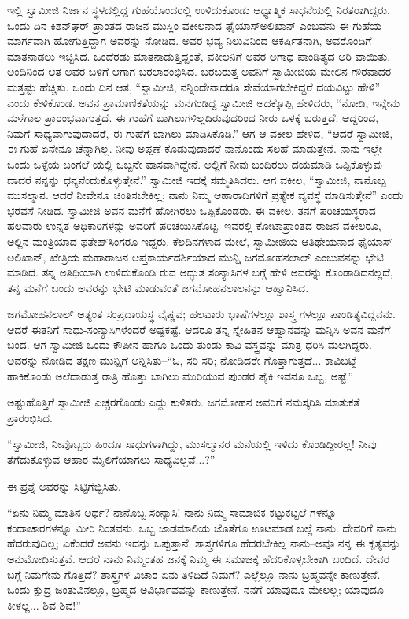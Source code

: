 ಇಲ್ಲಿ ಸ್ವಾಮೀಜಿ ನಿರ್ಜನ ಸ್ಥಳದಲ್ಲಿದ್ದ ಗುಹೆಯೊಂದರಲ್ಲಿ ಉಳಿದುಕೊಂಡು ಆಧ್ಯಾತ್ಮಿಕ ಸಾಧನೆಯಲ್ಲಿ ನಿರತರಾಗಿದ್ದರು. ಒಂದು ದಿನ ಕಿಶನ್​ಘರ್ ಪ್ರಾಂತದ ರಾಜನ ಮುಸ್ಲಿಂ ವಕೀಲನಾದ ಫೈಯಾಸ್​ಅಲಿಖಾನ್ ಎಂಬವನು ಈ ಗುಹೆಯ ಮಾರ್ಗವಾಗಿ ಹೋಗುತ್ತಿದ್ದಾಗ ಅವರನ್ನು ನೋಡಿದ. ಅವರ ಭವ್ಯ ನಿಲುವಿನಿಂದ ಆಕರ್ಷಿತನಾಗಿ, ಅವರೊಂದಿಗೆ ಮಾತನಾಡಲು ಇಚ್ಛಿಸಿದ. ಒಂದೆರಡು ಮಾತನಾಡುತ್ತಿದ್ದಂತೆ, ವಕೀಲನಿಗೆ ಅವರ ಅಗಾಧ ಪಾಂಡಿತ್ಯದ ಅರಿ ವಾಯಿತು. ಅಂದಿನಿಂದ ಆತ ಅವರ ಬಳಿಗೆ ಆಗಾಗ ಬರಲಾರಂಭಿಸಿದ. ಬರಬರುತ್ತ ಅವನಿಗೆ ಸ್ವಾಮೀಜಿಯ ಮೇಲಿನ ಗೌರವಾದರ ಮತ್ತಷ್ಟು ಹೆಚ್ಚಿತು. ಒಂದು ದಿನ ಆತ, “ಸ್ವಾಮೀಜಿ, ನನ್ನಿಂದೇನಾದರೂ ಸೇವೆಯಾಗಬೇಕಿದ್ದರೆ ದಯವಿಟ್ಟು ಹೇಳಿ” ಎಂದು ಕೇಳಿಕೊಂಡ. ಅವನ ಪ್ರಾಮಾಣಿಕತೆಯನ್ನು ಮನಗಂಡಿದ್ದ ಸ್ವಾಮೀಜಿ ಅದಕ್ಕೊಪ್ಪಿ ಹೇಳಿದರು, “ನೋಡಿ, ಇನ್ನೇನು ಮಳೆಗಾಲ ಪ್ರಾರಂಭವಾಗುತ್ತದೆ. ಈ ಗುಹೆಗೆ ಬಾಗಿಲುಗಳಿಲ್ಲದಿರುವುದರಿಂದ ನೀರು ಒಳಕ್ಕೆ ಬರುತ್ತದೆ. ಆದ್ದರಿಂದ, ನಿಮಗೆ ಸಾಧ್ಯವಾಗುವುದಾದರೆ, ಈ ಗುಹೆಗೆ ಬಾಗಿಲು ಮಾಡಿಸಿಕೊಡಿ.” ಆಗ ಆ ವಕೀಲ ಹೇಳಿದ, “ಆದರೆ ಸ್ವಾಮೀಜಿ, ಈ ಗುಹೆ ಏನೇನೂ ಚೆನ್ನಾಗಿಲ್ಲ. ನೀವು ಅಪ್ಪಣೆ ಕೊಡುವುದಾದರೆ ನಾನೊಂದು ಸಲಹೆ ಮಾಡುತ್ತೇನೆ. ನಾನು ಇಲ್ಲೇ ಒಂದು ಒಳ್ಳೆಯ ಬಂಗಲೆ ಯಲ್ಲಿ ಒಬ್ಬನೇ ವಾಸವಾಗಿದ್ದೇನೆ. ಅಲ್ಲಿಗೆ ನೀವು ಬಂದಿರಲು ದಯಮಾಡಿ ಒಪ್ಪಿಕೊಳ್ಳುವು ದಾದರೆ ನನ್ನನ್ನು ಧನ್ಯನೆಂದುಕೊಳ್ಳುತ್ತೇನೆ.” ಸ್ವಾಮೀಜಿ ಇದಕ್ಕೆ ಸಮ್ಮತಿಸಿದರು. ಆಗ ವಕೀಲ, “ಸ್ವಾಮೀಜಿ, ನಾನೊಬ್ಬ ಮುಸಲ್ಮಾನ. ಆದರೆ ನೀವೇನೂ ಚಿಂತಿಸಬೇಕಿಲ್ಲ; ನಾನು ನಿಮ್ಮ ಆಹಾರಾದಿಗಳಿಗೆ ಪ್ರತ್ಯೇಕ ವ್ಯವಸ್ಥೆ ಮಾಡಿಸುತ್ತೇನೆ” ಎಂದು ಭರವಸೆ ನೀಡಿದ. ಸ್ವಾಮೀಜಿ ಅವನ ಮನೆಗೆ ಹೋಗಿರಲು ಒಪ್ಪಿಕೊಂಡರು. ಈ ವಕೀಲ, ತನಗೆ ಪರಿಚಯಸ್ಥರಾದ ಹಲವಾರು ಉನ್ನತ ಅಧಿಕಾರಿಗಳನ್ನು ಅವರಿಗೆ ಪರಿಚಯಿಸಿಕೊಟ್ಟ. ಇವರಲ್ಲಿ ಕೋಟಾಪ್ರಾಂತದ ರಾಜನ ವಕೀಲರೂ, ಅಲ್ಲಿನ ಮಂತ್ರಿಯಾದ ಫತೇಹ್​ಸಿಂಗರೂ ಇದ್ದರು. ಕೆಲದಿನಗಳಾದ ಮೇಲೆ, ಸ್ವಾಮೀಜಿಯ ಆತಿಥೇಯನಾದ ಫೈಯಾಸ್ ಅಲಿಖಾನ್, ಖೇತ್ರಿಯ ಮಹಾರಾಜನ ಆಪ್ತಕಾರ್ಯದರ್ಶಿಯಾದ ಮುನ್ಷಿ ಜಗಮೋಹನಲಾಲ್ ಎಂಬುವನನ್ನು ಭೇಟಿ ಮಾಡಿದ. ತನ್ನ ಅತಿಥಿಯಾಗಿ ಉಳಿದುಕೊಂಡಿ ರುವ ಅದ್ಭುತ ಸಂನ್ಯಾಸಿಗಳ ಬಗ್ಗೆ ಹೇಳಿ ಅವರನ್ನು ಕೊಂಡಾಡಿದನಲ್ಲದೆ, ತನ್ನ ಮನೆಗೆ ಬಂದು ಅವರನ್ನು ಭೇಟಿ ಮಾಡುವಂತೆ ಜಗಮೋಹನಲಾಲನನ್ನು ಆಹ್ವಾನಿಸಿದ.

ಜಗಮೋಹನಲಾಲ್ ಅತ್ಯಂತ ಸಂಪ್ರದಾಯಸ್ಥ ವೈಷ್ಣವ; ಹಲವಾರು ಭಾಷೆಗಳಲ್ಲೂ ಶಾಸ್ತ್ರ ಗಳಲ್ಲೂ ಪಾಂಡಿತ್ಯವಿದ್ದವನು. ಆದರೆ ಈತನಿಗೆ ಸಾಧು-ಸಂನ್ಯಾಸಿಗಳೆಂದರೆ ಅಷ್ಟಕಷ್ಟೆ. ಆದರೂ ತನ್ನ ಸ್ನೇಹಿತನ ಆಹ್ವಾನವನ್ನು ಮನ್ನಿಸಿ ಅವನ ಮನೆಗೆ ಬಂದ. ಆಗ ಸ್ವಾಮೀಜಿ ಒಂದು ಕೌಪೀನ ಹಾಗೂ ಒಂದು ತುಂಡು ಕಾವಿ ವಸ್ತ್ರವನ್ನು ಮಾತ್ರ ಧರಿಸಿ ಮಲಗಿದ್ದರು. ಅವರನ್ನು ನೋಡಿದ ತಕ್ಷಣ ಮುನ್ಷಿಗೆ ಅನ್ನಿಸಿತು–“ಓ, ಸರಿ ಸರಿ; ನೋಡಿದರೇ ಗೊತ್ತಾಗುತ್ತದೆ... ಕಾವಿಬಟ್ಟೆ ಹಾಕಿಕೊಂಡು ಅಲೆದಾಡುತ್ತ ರಾತ್ರಿ ಹೊತ್ತು ಬಾಗಿಲು ಮುರಿಯುವ ಪುಂಡರ ಪೈಕಿ ಇವನೂ ಒಬ್ಬ, ಅಷ್ಟೆ.”

ಅಷ್ಟುಹೊತ್ತಿಗೆ ಸ್ವಾಮೀಜಿ ಎಚ್ಚರಗೊಂಡು ಎದ್ದು ಕುಳಿತರು. ಜಗಮೋಹನ ಅವರಿಗೆ ನಮಸ್ಕರಿಸಿ ಮಾತುಕತೆ ಪ್ರಾರಂಭಿಸಿದ.

“ಸ್ವಾಮೀಜಿ, ನೀವೊಬ್ಬರು ಹಿಂದೂ ಸಾಧುಗಳಾಗಿದ್ದು, ಮುಸಲ್ಮಾನರ ಮನೆಯಲ್ಲಿ ಇಳಿದು ಕೊಂಡಿದ್ದೀರಲ್ಲ! ನೀವು ತೆಗೆದುಕೊಳ್ಳುವ ಆಹಾರ ಮೈಲಿಗೆಯಾಗಲು ಸಾಧ್ಯವಿಲ್ಲವೆ...?”

ಈ ಪ್ರಶ್ನೆ ಅವರನ್ನು ಸಿಟ್ಟಿಗೆಬ್ಬಿಸಿತು.

“ಏನು ನಿಮ್ಮ ಮಾತಿನ ಅರ್ಥ? ನಾನೊಬ್ಬ ಸಂನ್ಯಾಸಿ! ನಾನು ನಿಮ್ಮ ಸಾಮಾಜಿಕ ಕಟ್ಟುಕಟ್ಟಲೆ ಗಳನ್ನೂ ಕಂದಾಚಾರಗಳನ್ನೂ ಮೀರಿ ನಿಂತವನು. ಒಬ್ಬ ಜಾಡಮಾಲಿಯ ಜೊತೆಗೂ ಊಟಮಾಡ ಬಲ್ಲೆ ನಾನು. ದೇವರಿಗೆ ನಾನು ಹೆದರುವುದಿಲ್ಲ; ಏಕೆಂದರೆ ಅವನು ಇದನ್ನು ಒಪ್ಪುತ್ತಾನೆ. ಶಾಸ್ತ್ರಗಳಿಗೂ ಹೆದರಬೇಕಿಲ್ಲ ನಾನು–ಅವೂ ನನ್ನ ಈ ಕೃತ್ಯವನ್ನು ಅನುಮೋದಿಸುತ್ತವೆ. ಆದರೆ ನಾನು ನಿಮ್ಮಂತಹ ಜನಕ್ಕೆ ನಿಮ್ಮ ಈ ಸಮಾಜಕ್ಕೆ ಹೆದರಿಕೊಳ್ಳಬೇಕಾಗಿ ಬಂದಿದೆ. ದೇವರ ಬಗ್ಗೆ ನಿಮಗೇನು ಗೊತ್ತಿದೆ? ಶಾಸ್ತ್ರಗಳ ವಿಚಾರ ಏನು ತಿಳಿದಿದೆ ನಿಮಗೆ? ಎಲ್ಲೆಲ್ಲೂ ನಾನು ಬ್ರಹ್ಮವನ್ನೇ ಕಾಣುತ್ತೇನೆ. ಒಂದು ಕ್ಷುದ್ರ ಜಂತುವಿನಲ್ಲೂ, ಬ್ರಹ್ಮದ ಅವಿರ್ಭಾವವನ್ನು ಕಾಣುತ್ತೇನೆ. ನನಗೆ ಯಾವುದೂ ಮೇಲಲ್ಲ; ಯಾವುದೂ ಕೀಳಲ್ಲ... ಶಿವ ಶಿವ!”


